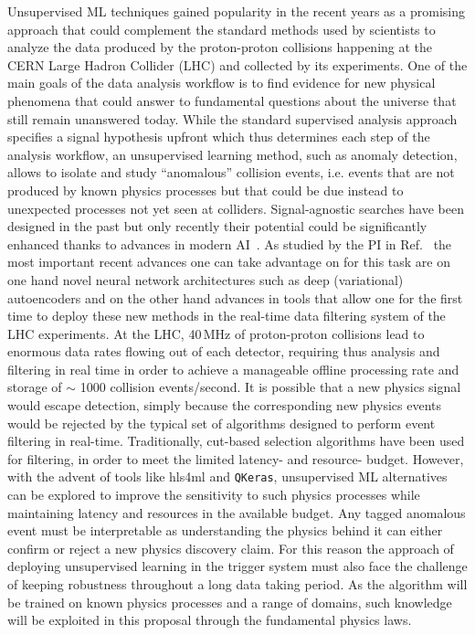 Unsupervised ML techniques gained popularity in the recent years as a promising approach that could complement the standard methods used by scientists to analyze the data produced by the proton-proton collisions happening at the CERN Large Hadron Collider (LHC) and collected by its experiments. One of the main goals of the data analysis workflow is to find evidence for new physical phenomena that could answer to fundamental questions about the universe that still remain unanswered today.
While the standard supervised analysis approach specifies a signal hypothesis upfront which thus determines each step of the analysis workflow, an unsupervised learning method, such as anomaly detection, allows to isolate and study ``anomalous'' collision events, i.e. events that are not produced by known physics processes but that could be due instead to unexpected processes not yet seen at colliders. Signal-agnostic searches have been designed in the past but only recently their potential could be significantly enhanced thanks to advances in modern AI~\cite{Govorkova:2021utb}. As studied by the PI in Ref.~\cite{Govorkova:2021utb} the most important recent advances one can take advantage on for this task are on one hand novel neural network architectures such as deep (variational) autoencoders and on the other hand advances in tools that allow one for the first time to deploy these new methods in the real-time data filtering system of the LHC experiments.
At the LHC, 40\,MHz of proton-proton collisions lead to enormous data rates flowing out of each detector, requiring thus analysis and filtering in real time in order to achieve a manageable offline processing rate and storage of $\sim$ 1000 collision events/second. It is possible that a new physics signal would escape detection, simply because the corresponding new physics events would be rejected by the typical set of algorithms designed to perform event filtering in real-time. Traditionally, cut-based selection algorithms have been used for filtering, in order to meet the limited latency- and resource- budget. However, with the advent of tools like hls4ml and \texttt{QKeras}, unsupervised ML alternatives can be explored to improve the sensitivity to such physics processes while maintaining latency and resources in the available budget.  Any tagged anomalous event must be interpretable as understanding the physics behind it can either confirm or reject a new physics discovery claim. For this reason the approach of deploying unsupervised learning in the trigger system must also face the challenge of keeping robustness throughout a long data taking period. As the algorithm will be trained on known physics processes and a range of domains, such knowledge will be exploited in this proposal through the fundamental physics laws.

